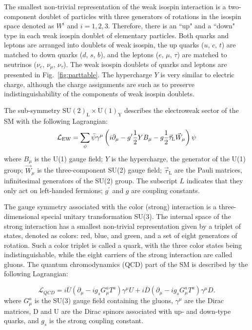 The smallest non-trivial representation of the weak isospin interaction is
a two-component doublet of particles with three generators
of rotations in the isospin space denoted as $W^i$ and $i=1,2,3$.
Therefore, there is an ``up" and a ``down" type in each weak isospin doublet of elementary particles.
Both quarks and leptons are arranged into doublets of weak isospin, the up quarks ($u$, $c$, $t$)
are matched to down quarks ($d$, $s$, $b$), and the leptons ($e$, $\mu$, $\tau$) are matched
to neutrinos ($\nu_e$, $\nu_{\mu}$, $\nu_{\tau}$). The weak isospin doublets of quarks and leptons
are presented in Fig.~\ref{fig:parttable}.  
The hypercharge $Y$ is very similar to electric charge, although the charge assignments
are such as to preserve indistinguishability of the components
of weak isospin doublets.

The sub-symmetry $\text{SU}(2)_\text{L} \times \text{U}(1)_\text{Y}$ describes the electroweak sector of the SM with the 
following Lagrangian:
\begin{equation}
\mathcal{L}_\mathrm{EW} = \sum_\psi\bar\psi\gamma^\mu \left(i\partial_\mu-g^\prime{1\over2}YB_\mu-g{1\over2}\vec\tau_\mathrm{L}\vec W_\mu\right)\psi
\label{eqn:LagrEWK}
\end{equation}
where $B_{\mu}$ is the U(1) gauge field; $Y$ is the hypercharge, the generator of 
the U(1) group; $\vec{W}_\mu$ is the three-component SU(2) gauge field; $\vec{\tau}_\mathrm{L}$
 are the Pauli matrices, infinitesimal generators of the SU(2) group. 
The subscript $L$ indicates that they only act on left-handed fermions; $g^{'}$ and $g$
 are coupling constants.


The gauge symmetry associated with the color (strong) interaction is a three-dimensional special
unitary transformation SU(3). The internal space of the strong interaction has a smallest
non-trivial representation given by a triplet of states, denoted as colors: red, blue, and green,
and a set of eight generators of rotation. Such a color triplet is called a quark, with the
three color states being indistinguishable, while the
eight carriers of the strong interaction are called gluons. 
The quantum chromodynamics (QCD)
part of the SM is described by the following Lagrangian:

\begin{equation}
\mathcal{L}_{QCD} = i\overline U (\partial_\mu-ig_sG_\mu^a T^a)\gamma^\mu U + i\overline D (\partial_\mu-i g_s G_\mu^a T^a)\gamma^\mu D.
\label{eqn:LagrQCD}
\end{equation}
where $G_\mu^a$ is the SU(3) gauge field containing the gluons, $\gamma^\mu$ are the Dirac matrices,
 D and U are the Dirac spinors associated with up- and down-type quarks, and $g_s$ 
is the strong coupling constant.

